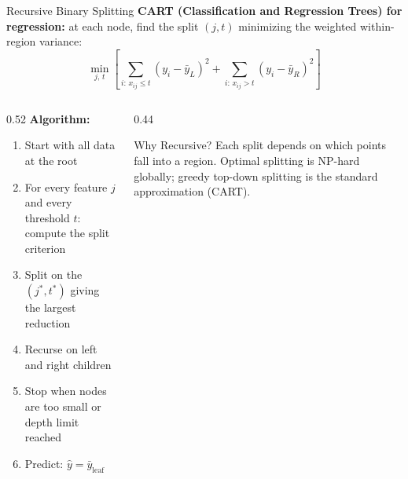 \documentclass[aspectratio=169, 10pt]{beamer}
\begin{document}
\begin{frame}{Recursive Binary Splitting}
  \textbf{CART (Classification and Regression Trees) for regression:} at each node, find the split $(j, t)$ minimizing
  the weighted within-region variance:
  \[
    \min_{j,\, t}
    \left[
      \sum_{i:\, x_{ij} \leq t} (y_i - \bar{y}_{L})^2
      +
      \sum_{i:\, x_{ij} > t} (y_i - \bar{y}_{R})^2
    \right]
  \]

  \begin{columns}[T]
    \begin{column}{0.52\textwidth}
      \textbf{Algorithm:}
      \begin{enumerate}
        \item Start with all data at the root
        \item For every feature $j$ and every threshold $t$:
              compute the split criterion
        \item Split on the $(j^*, t^*)$ giving the largest reduction
        \item Recurse on left and right children
        \item Stop when nodes are too small or depth limit reached
        \item Predict: $\hat{y} = \bar{y}_{\text{leaf}}$
      \end{enumerate}
    \end{column}
    \begin{column}{0.44\textwidth}
      \begin{examplebox}{Why Recursive?}
        Each split depends on which points fall into a region.
        Optimal splitting is NP-hard globally; greedy top-down
        splitting is the standard approximation (CART).
      \end{examplebox}
    \end{column}
  \end{columns}
\end{frame}
\end{document}
